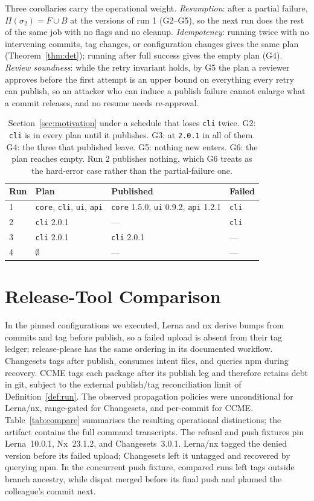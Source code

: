 \documentclass[sigconf,nonacm]{acmart}
\newcommand{\code}[1]{\texttt{#1}}
\newcommand{\G}[1]{G#1}
\begin{document}
Three corollaries carry the operational weight. \emph{Resumption}: after
a partial failure, $\Pi(\sigma_2) = F \cup B$ at the versions of run 1
(\G{2}--\G{5}), so the next run does the rest of the same job with no
flags and no cleanup. \emph{Idempotency}: running twice with no intervening
commits, tag changes, or configuration changes gives the same plan
(Theorem~\ref{thm:det});
running after full success gives the empty plan (\G{4}).
\emph{Review soundness}: while the retry invariant holds, by \G{5} the plan a reviewer approves before
the first attempt is an upper bound on everything every retry can
publish, so an attacker who can induce a publish failure cannot enlarge
what a commit releases, and no resume needs re-approval.

\begin{table}[t]
\caption{Section~\ref{sec:motivation} under a schedule that loses
\code{cli} twice. \G{2}: \code{cli} is in every plan until it
publishes. \G{3}: at \code{2.0.1} in all of them. \G{4}: the three that
published leave. \G{5}: nothing new enters. \G{6}: the plan reaches
empty. Run 2 publishes nothing, which \G{6} treats as the hard-error
case rather than the partial-failure one.}
\label{tab:runs}
\small
\begin{tabular}{@{}llll@{}}
\toprule
Run & Plan & Published & Failed \\
\midrule
1 & \code{core}, \code{cli}, \code{ui}, \code{api}
  & \code{core} 1.5.0, \code{ui} 0.9.2, \code{api} 1.2.1 & \code{cli} \\
2 & \code{cli} 2.0.1 & --- & \code{cli} \\
3 & \code{cli} 2.0.1 & \code{cli} 2.0.1 & --- \\
4 & $\emptyset$ & --- & --- \\
\bottomrule
\end{tabular}
\end{table}

\section{Release-Tool Comparison}
\label{sec:compare}

In the pinned configurations we executed, Lerna and nx derive bumps from
commits and tag before publish, so a failed upload is absent from their tag
ledger; release-please has the same ordering in its documented workflow.
Changesets tags after publish, consumes intent files, and queries npm during
recovery.
CCME tags each package after its publish leg and therefore retains debt in git,
subject to the external publish/tag reconciliation limit of
Definition~\ref{def:run}. The observed propagation policies were unconditional
for Lerna/nx, range-gated for Changesets, and per-commit for CCME.
Table~\ref{tab:compare}
summarises the resulting operational distinctions; the artifact contains the
full command transcripts.
The refusal and push fixtures pin Lerna~10.0.1, Nx~23.1.2, and
Changesets~3.0.1. Lerna/nx tagged the denied version before its failed upload;
Changesets left it untagged and recovered by querying npm. In the concurrent
push fixture, compared runs left tags outside branch ancestry, while dispat
merged before its final push and planned the colleague's commit next.
\end{document}
